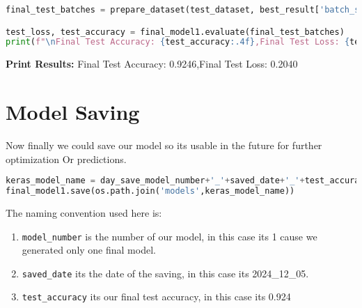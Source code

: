 \documentclass[12pt,a4paper]{article}
\begin{document}
\begin{lstlisting}[language=Python]
final_test_batches = prepare_dataset(test_dataset, best_result['batch_size'],is_training=False)

test_loss, test_accuracy = final_model1.evaluate(final_test_batches)
print(f"\nFinal Test Accuracy: {test_accuracy:.4f},Final Test Loss: {test_loss:.4f}")
\end{lstlisting}
\textbf{Print Results:}
Final Test Accuracy: 0.9246,Final Test Loss: 0.2040

\section{Model Saving}
Now finally we could save our model so its usable in the future for further optimization Or predictions.
\begin{lstlisting}[language=Python]
keras_model_name = day_save_model_number+'_'+saved_date+'_'+test_accuracy+'.keras'
final_model1.save(os.path.join('models',keras_model_name))
\end{lstlisting}
The naming convention used here is:
\begin{enumerate}

\item \texttt{model\_number} is the number of our model, in this case its 1 cause we generated only one final model.
\item \texttt{saved\_date} its the date of the saving, in this case its 2024\_12\_05.
\item \texttt{test\_accuracy} its our final test accuracy, in this case its 0.924

\end{enumerate}
\end{document}
